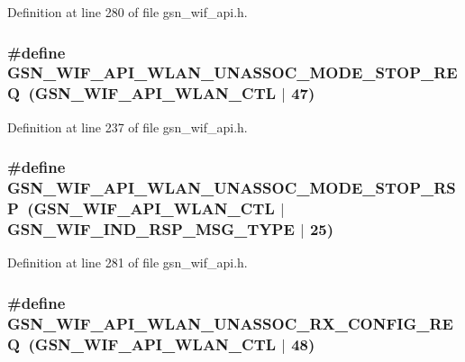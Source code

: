 Definition at line 280 of file gsn\_\-wif\_\-api.h.

\hypertarget{a00606_af138445c1bd5c29a416711575f28f054}{
\subsubsection[{GSN\_\-WIF\_\-API\_\-WLAN\_\-UNASSOC\_\-MODE\_\-STOP\_\-REQ}]{\setlength{\rightskip}{0pt plus 5cm}\#define GSN\_\-WIF\_\-API\_\-WLAN\_\-UNASSOC\_\-MODE\_\-STOP\_\-REQ~(GSN\_\-WIF\_\-API\_\-WLAN\_\-CTL $|$ 47)}}
\label{a00606_af138445c1bd5c29a416711575f28f054}


Definition at line 237 of file gsn\_\-wif\_\-api.h.

\hypertarget{a00606_aaae2b9eaaef814ac098dbe0e78b79dcb}{
\subsubsection[{GSN\_\-WIF\_\-API\_\-WLAN\_\-UNASSOC\_\-MODE\_\-STOP\_\-RSP}]{\setlength{\rightskip}{0pt plus 5cm}\#define GSN\_\-WIF\_\-API\_\-WLAN\_\-UNASSOC\_\-MODE\_\-STOP\_\-RSP~(GSN\_\-WIF\_\-API\_\-WLAN\_\-CTL $|$ GSN\_\-WIF\_\-IND\_\-RSP\_\-MSG\_\-TYPE $|$ 25)}}
\label{a00606_aaae2b9eaaef814ac098dbe0e78b79dcb}


Definition at line 281 of file gsn\_\-wif\_\-api.h.

\hypertarget{a00606_ab9c67f0a15ac24f03be0d69cfdc76f2d}{
\subsubsection[{GSN\_\-WIF\_\-API\_\-WLAN\_\-UNASSOC\_\-RX\_\-CONFIG\_\-REQ}]{\setlength{\rightskip}{0pt plus 5cm}\#define GSN\_\-WIF\_\-API\_\-WLAN\_\-UNASSOC\_\-RX\_\-CONFIG\_\-REQ~(GSN\_\-WIF\_\-API\_\-WLAN\_\-CTL $|$ 48)}}
\label{a00606_ab9c67f0a15ac24f03be0d69cfdc76f2d}


